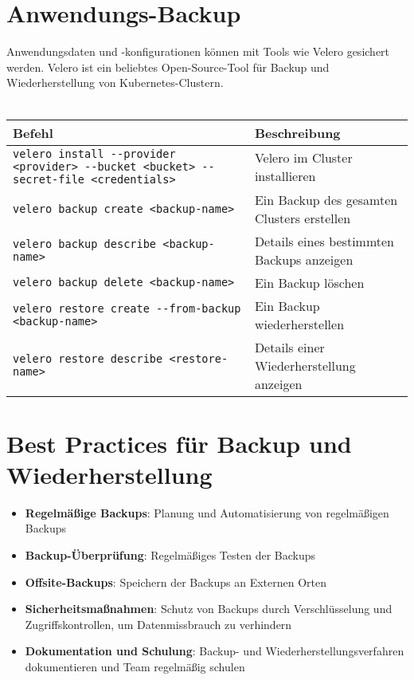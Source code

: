 \section{Anwendungs-Backup}
Anwendungsdaten und -konfigurationen können mit Tools wie Velero gesichert werden. Velero ist ein beliebtes Open-Source-Tool für Backup und Wiederherstellung von Kubernetes-Clustern.\\
\phantom{.}\\
\begin{tabular}{|p{}|p{}|}
\hline
\textbf{Befehl} & \textbf{Beschreibung} \\
\hline
\texttt{velero install {-}{-}provider <provider> {-}{-}bucket <bucket> {-}{-}secret-file <credentials>} & Velero im Cluster installieren \\
\texttt{velero backup create <backup-name>} & Ein Backup des gesamten Clusters erstellen \\
\texttt{velero backup describe <backup-name>} & Details eines bestimmten Backups anzeigen \\
\texttt{velero backup delete <backup-name>} & Ein Backup löschen \\
\texttt{velero restore create {-}{-}from-backup <backup-name>} & Ein Backup wiederherstellen \\
\texttt{velero restore describe <restore-name>} & Details einer Wiederherstellung anzeigen \\
\hline
\end{tabular}
\newpage
\section{Best Practices für Backup und Wiederherstellung}
\begin{itemize}
    \item \textbf{Regelmäßige Backups}: Planung und Automatisierung von regelmäßigen Backups
    \item \textbf{Backup-Überprüfung}: Regelmäßiges Testen der Backups
    \item \textbf{Offsite-Backups}: Speichern der Backups an Externen Orten
    \item \textbf{Sicherheitsmaßnahmen}: Schutz von Backups durch Verschlüsselung und Zugriffskontrollen, um Datenmissbrauch zu verhindern
    \item \textbf{Dokumentation und Schulung}: Backup- und Wiederherstellungsverfahren dokumentieren und Team regelmäßig schulen
\end{itemize}
